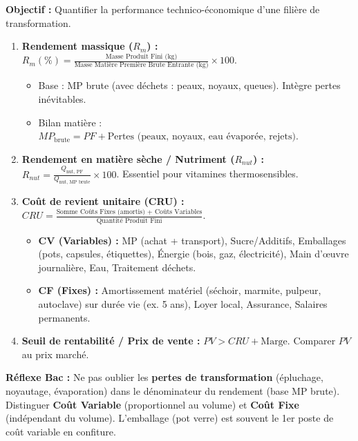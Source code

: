 \documentclass[11pt]{article}
\begin{document}
\begin{methode}
    \textbf{Objectif :} Quantifier la performance technico-économique d'une filière de transformation.
    \begin{enumerate}
        \item \textbf{Rendement massique ($R_m$) :} $R_m (\%) = \frac{\text{Masse Produit Fini (kg)}}{\text{Masse Matière Première Brute Entrante (kg)}} \times 100$.
            \begin{itemize}
                \item Base : MP brute (avec déchets : peaux, noyaux, queues). Intègre pertes inévitables.
                \item Bilan matière : $MP_{\text{brute}} = PF + \text{Pertes (peaux, noyaux, eau évaporée, rejets)}$.
            \end{itemize}
        \item \textbf{Rendement en matière sèche / Nutriment ($R_{nut}$) :} $R_{nut} = \frac{Q_{\text{nut, PF}}}{Q_{\text{nut, MP brute}}} \times 100$. Essentiel pour vitamines thermosensibles.
        \item \textbf{Coût de revient unitaire (CRU) :} $CRU = \frac{\text{Somme Coûts Fixes (amortis) + Coûts Variables}}{\text{Quantité Produit Fini}}$.
            \begin{itemize}
                \item \textbf{CV (Variables) :} MP (achat + transport), Sucre/Additifs, Emballages (pots, capsules, étiquettes), Énergie (bois, gaz, électricité), Main d'œuvre journalière, Eau, Traitement déchets.
                \item \textbf{CF (Fixes) :} Amortissement matériel (séchoir, marmite, pulpeur, autoclave) sur durée vie (ex. 5 ans), Loyer local, Assurance, Salaires permanents.
            \end{itemize}
        \item \textbf{Seuil de rentabilité / Prix de vente :} $PV > CRU + \text{Marge}$. Comparer $PV$ au prix marché.
    \end{enumerate}
    \textbf{Réflexe Bac :} Ne pas oublier les \textbf{pertes de transformation} (épluchage, noyautage, évaporation) dans le dénominateur du rendement (base MP brute). Distinguer \textbf{Coût Variable} (proportionnel au volume) et \textbf{Coût Fixe} (indépendant du volume). L'emballage (pot verre) est souvent le 1er poste de coût variable en confiture.
\end{methode}
\end{document}
